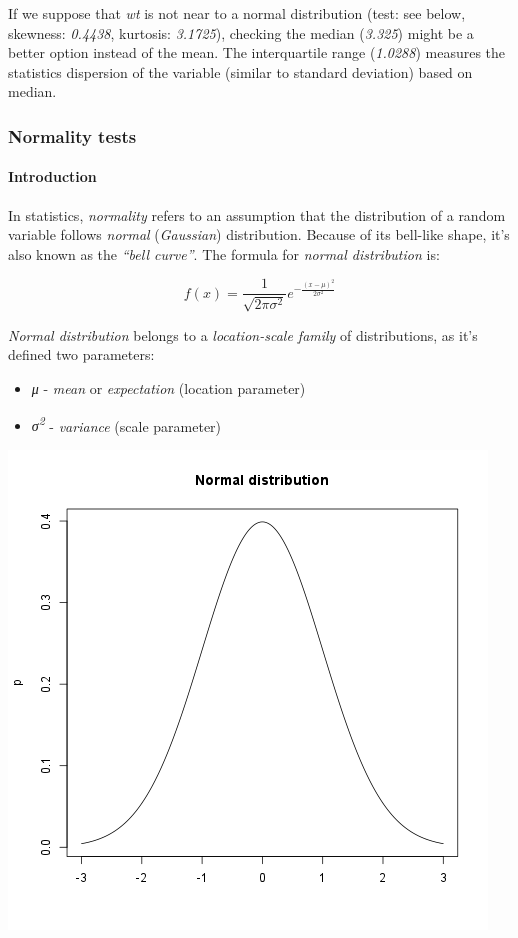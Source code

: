 \documentclass[]{article}
\makeatletter
\def\maxwidth{\ifdim\Gin@nat@width>\linewidth\linewidth
\else\Gin@nat@width\fi}
\let\Oldincludegraphics\includegraphics
\renewcommand{\includegraphics}[1]{\Oldincludegraphics[width=\maxwidth]{#1}}
\makeatother
\begin{document}
If we suppose that \emph{wt} is not near to a normal distribution (test:
see below, skewness: \emph{0.4438}, kurtosis: \emph{3.1725}), checking
the median (\emph{3.325}) might be a better option instead of the mean.
The interquartile range (\emph{1.0288}) measures the statistics
dispersion of the variable (similar to standard deviation) based on
median.

\subsubsection{Normality tests}

\paragraph{Introduction}

In statistics, \emph{normality} refers to an assumption that the
distribution of a random variable follows \emph{normal}
(\emph{Gaussian}) distribution. Because of its bell-like shape, it's
also known as the \emph{``bell curve''}. The formula for \emph{normal
distribution} is:

\[f(x) = \frac{1}{\sqrt{2\pi{}\sigma{}^2}} e^{-\frac{(x-\mu{})^2}{2\sigma{}^2}}\]

\emph{Normal distribution} belongs to a \emph{location-scale family} of
distributions, as it's defined two parameters:

\begin{itemize}
\item
  \emph{μ} - \emph{mean} or \emph{expectation} (location parameter)
\item
  \emph{σ\textsuperscript{2}} - \emph{variance} (scale parameter)
\end{itemize}
\href{/tmp/RtmpeIwHkw/file32221e18-hires.png}{\includegraphics{806ea97c59e1a12d4acae4968957aaa9.png}}
\end{document}
